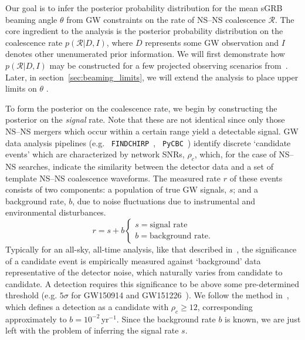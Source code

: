 \documentclass[twocolumn,nofootinbib]{revtex4-1}
\newcommand{\cbcrate}{{{\mathcal R}}}
\newcommand{\BNS}{\ac{NS}--\ac{NS}\xspace}
\newcommand{\arw}[1]{{\color{dgreen}{#1}}}
\begin{document}
Our goal is to infer the posterior probability distribution for the mean
\ac{sGRB} beaming angle $\theta$ from \ac{GW} constraints on the rate of \BNS
coalescence $\cbcrate$.  The core ingredient to the analysis is the posterior
probability distribution on the coalescence rate $p(\cbcrate|D,I)$, where $D$
represents some \ac{GW} observation and $I$ denotes other unenumerated prior
information.  We will first demonstrate how $p(\cbcrate|D,I)$ may be constructed
for a few projected observing scenarios from~\cite{Aasi:2013wya}.  Later, in
section~\ref{sec:beaming_limits}, we will extend the analysis to place upper
limits on $\theta$ \arw{based upon the lack of detection during O1}.

To form the posterior on the coalescence rate, we begin by constructing the
posterior on the \emph{signal} rate.  Note that these are not identical since
only those \BNS mergers which occur within a certain range yield a detectable
signal.  \ac{GW} data analysis pipelines (e.g. {\tt
FINDCHIRP}~\cite{2012PhRvD..85l2006A}, {\tt
PyCBC}~\cite{Canton:2014ena,Usman:2015kfa,alex_nitz_2016_197080}) identify
discrete `candidate events' which are characterized by network \acp{SNR},
$\rho_c$, which, for the case of \BNS searches, indicate the similarity between
the detector data and a set of template \BNS coalescence waveforms.  The
measured rate $r$ of these events consists of two components: a population of
true \ac{GW} signals, $s$; and a background rate, $b$, due to noise fluctuations
due to instrumental and environmental disturbances.
%
\begin{equation}
r = s + b
\begin{cases}
s = \text{signal rate} \\
b = \text{background rate}.
\end{cases}
\end{equation}
%
Typically for an all-sky, all-time analysis, like that described
in~\cite{Usman:2015kfa}, the significance of a candidate event is
empirically measured against `background' data representative of the
detector noise, which naturally varies from candidate to candidate.  A
detection requires this significance to be above some pre-determined
threshold (e.g. $5\sigma$ for GW150914 and
GW151226~\cite{Abbott:2016blz,Abbott:2016nmj}).  We follow the method
in~\cite{Aasi:2013wya}, which defines a detection as a candidate with
$\rho_c \geq 12$, corresponding approximately to
$b=10^{-2}$\,yr$^{-1}$.  Since the background rate $b$ is known, we
are just left with the problem of inferring the signal rate $s$.
\end{document}
